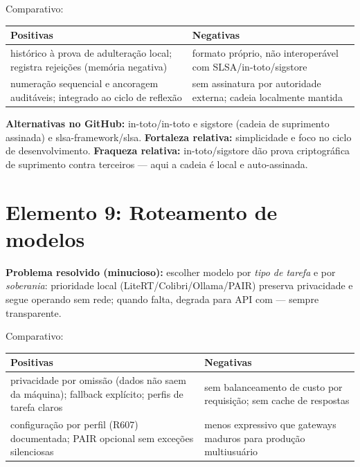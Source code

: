 \begin{resultado}
Comparativo:\par
\smallskip
{\footnotesize
\begin{tabularx}{\linewidth}{YY}
\toprule
Positivas & Negativas \\
\midrule
histórico à prova de adulteração local; registra rejeições (memória negativa) &
formato próprio, não interoperável com SLSA/in-toto/sigstore \\
numeração sequencial e ancoragem auditáveis; integrado ao ciclo de reflexão &
sem assinatura por autoridade externa; cadeia localmente mantida \\
\bottomrule
\end{tabularx}\par}
\end{resultado}

\begin{metodo}
\textbf{Alternativas no GitHub:} in-toto/in-toto e sigstore (cadeia de
suprimento assinada) e slsa-framework/slsa. \textbf{Fortaleza relativa:}
simplicidade e foco no ciclo de desenvolvimento. \textbf{Fraqueza relativa:}
in-toto/sigstore dão prova criptográfica de suprimento contra terceiros — aqui a
cadeia é local e auto-assinada.
\end{metodo}

\clearpage
\section{Elemento 9: Roteamento de modelos}


\begin{funcao}
\textbf{Problema resolvido (minucioso):} escolher modelo por \emph{tipo de
tarefa} e por \emph{soberania}: prioridade local (LiteRT/Colibri/Ollama/PAIR)
preserva privacidade e segue operando sem rede; quando falta, degrada para API
com  — sempre transparente.
\end{funcao}

\begin{resultado}
Comparativo:\par
\smallskip
{\footnotesize
\begin{tabularx}{\linewidth}{YY}
\toprule
Positivas & Negativas \\
\midrule
privacidade por omissão (dados não saem da máquina); fallback explícito; perfis
de tarefa claros & sem balanceamento de custo por requisição; sem cache de
respostas \\
configuração por perfil (R607) documentada; PAIR opcional sem exceções
silenciosas & menos expressivo que gateways maduros para produção multiusuário \\
\bottomrule
\end{tabularx}\par}
\end{resultado}

